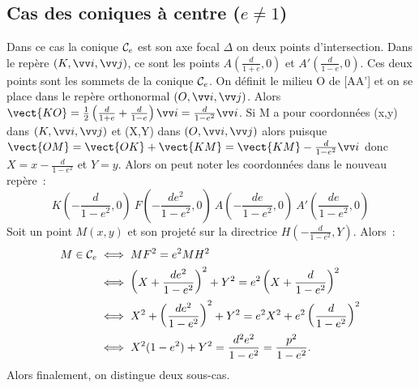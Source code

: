 \subsection{Cas des coniques à centre ($e\neq 1$)}
Dans ce cas la conique $\mathcal{C}_e$ est son axe focal $\Delta$ on deux points d'intersection. Dans le repère $(K,\vi,\vj)$, ce sont les points $A(\frac{d}{1+e},0)$ et $A'(\frac{d}{1-e},0)$. Ces deux points sont les sommets de la conique $\mathcal{C}_e$. On définit le milieu O de [AA'] et on se place dans le repère orthonormal $\rond$. Alors $\vect{KO}=\frac{1}{2}\left(\frac{d}{1+e}+\frac{d}{1-e}\right)\vi=\frac{d}{1-e^2}\vi$. Si M a pour coordonnées (x,y) dans $(K,\vi,\vj)$ et (X,Y) dans $\rond$ alors puisque $\vect{OM}=\vect{OK}+\vect{KM}=\vect{KM}-\frac{d}{1-e^2}\vi$ donc $X=x-\frac{d}{1-e^2}$ et $Y=y$. Alors on peut noter les coordonnées dans le nouveau repère~:
\begin{equation}
  K\left(-\frac{d}{1-e^2},0\right) \ F\left(-\frac{de^2}{1-e^2},0\right) \ A\left(-\frac{de}{1-e^2},0\right) \ A'\left(\frac{de}{1-e^2},0\right)
\end{equation}
Soit un point $M(x,y)$ et son projeté sur la directrice $H\left(-\frac{d}{1-e^2},Y\right)$. Alors~:
\begin{align}
  M \in \mathcal{C}_e &\iff MF^2=e^2 MH^2\\
  &\iff \left(X+\frac{de^2}{1-e^2}\right)^2+Y^2=e^2 \left(X+\frac{d}{1-e^2}\right)^2\\
  &\iff X^2+\left(\frac{de^2}{1-e^2}\right)^2+Y^2=e^2 X^2+e^2\left(\frac{d}{1-e^2}\right)^2\\
&\iff X^2(1-e^2)+Y^2=\frac{d^2e^2}{1-e^2}=\frac{p^2}{1-e^2}.
\end{align}
Alors finalement, on distingue deux sous-cas.


